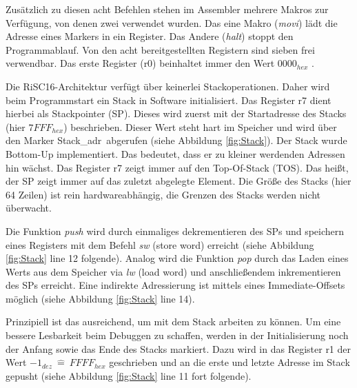 \documentclass[fleqn, a4paper, 11pt]{article}       %
\begin{document}

\noindent Zusätzlich zu diesen acht Befehlen stehen im Assembler mehrere Makros zur Verfügung, von denen zwei verwendet wurden. Das eine Makro (\emph{movi}) lädt die Adresse eines Markers in ein Register. Das Andere (\emph{halt}) stoppt den Programmablauf. Von den acht bereitgestellten Registern sind sieben frei verwendbar. Das erste Register (r0) beinhaltet immer den Wert $0000_{hex}$ \cite[1]{JACOBInstr}.


Die RiSC16-Architektur verfügt über keinerlei Stackoperationen. Daher wird beim Programmstart ein Stack in Software initialisiert. Das Register r7 dient hierbei als Stackpointer (SP). Dieses wird zuerst mit der Startadresse des Stacks (hier $7FFF_{hex}$) beschrieben. Dieser Wert steht hart im Speicher und wird über den Marker \glqq Stack\_adr\grqq \ abgerufen (siehe  Abbildung \ref{fig:Stack}).
Der Stack wurde   Bottom-Up implementiert. Das bedeutet, dass er zu kleiner werdenden Adressen hin wächst. Das Register r7 zeigt immer auf den Top-Of-Stack (TOS). Das heißt, der SP zeigt immer auf das zuletzt abgelegte Element. Die Größe des Stacks (hier 64 Zeilen) ist rein hardwareabhängig, die Grenzen des Stacks werden nicht überwacht.

Die Funktion \emph{push}  wird durch einmaliges dekrementieren des SPs und speichern eines Registers mit dem Befehl \emph{sw} (store word) erreicht (siehe Abbildung \ref{fig:Stack} line 12 folgende). Analog wird die Funktion \emph{pop} durch das Laden eines Werts aus dem Speicher via \emph{lw} (load word) und anschließendem inkrementieren des SPs erreicht. Eine indirekte Adressierung ist mittels eines Immediate-Offsets möglich (siehe Abbildung \ref{fig:Stack} line 14).

Prinzipiell ist das ausreichend, um mit dem Stack arbeiten zu können. Um eine bessere Lesbarkeit beim Debuggen zu schaffen, werden in der Initialisierung noch der Anfang sowie das Ende des Stacks markiert. Dazu wird in das Register r1 der Wert $-1_{dez}\ \widehat{=}\ FFFF_{hex}$ geschrieben und an die erste und letzte Adresse im Stack gepusht (siehe Abbildung \ref{fig:Stack} line 11 fort folgende).
\end{document}
